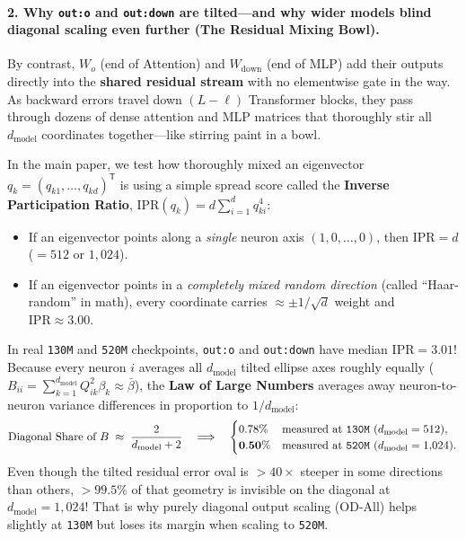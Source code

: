 \documentclass[11pt]{article}
\newcommand{\Tr}{{\mathsf{T}}}
\newcommand{\dm}{d_{\mathrm{model}}}
\newcommand{\mname}[1]{#1}
\begin{document}
\paragraph{2. Why \texttt{out:o} and \texttt{out:down} are tilted---and why wider models blind diagonal scaling even further (The Residual Mixing Bowl).}
By contrast, $W_o$ (end of Attention) and $W_{\mathrm{down}}$ (end of MLP) add their outputs directly into the \textbf{shared residual stream} with no elementwise gate in the way.
As backward errors travel down $(L-\ell)$ Transformer blocks, they pass through dozens of dense attention and MLP matrices that thoroughly stir all $\dm$ coordinates together---like stirring paint in a bowl.

In the main paper, we test how thoroughly mixed an eigenvector $q_k = (q_{k1},\dots,q_{kd})^{\Tr}$ is using a simple spread score called the \textbf{Inverse Participation Ratio}, $\mathrm{IPR}(q_k) = d\sum_{i=1}^{d} q_{ki}^4$:
\begin{itemize}[leftmargin=1.5em, itemsep=1.5pt, topsep=2pt]
  \item If an eigenvector points along a \emph{single} neuron axis $(1,0,\dots,0)$, then $\mathrm{IPR} = d$ ($=512$ or $1{,}024$).
  \item If an eigenvector points in a \emph{completely mixed random direction} (called ``Haar-random'' in math), every coordinate carries $\approx \pm 1/\sqrt{d}$ weight and $\mathrm{IPR} \approx \mathbf{3.00}$.
\end{itemize}
In real \texttt{130M} and \texttt{520M} checkpoints, \texttt{out:o} and \texttt{out:down} have median $\mathrm{IPR} = \mathbf{3.01}$!
Because every neuron $i$ averages all $\dm$ tilted ellipse axes roughly equally ($B_{ii} = \sum_{k=1}^{\dm} Q_{ik}^2 \beta_k \approx \bar{\beta}$), the \textbf{Law of Large Numbers} averages away neuron-to-neuron variance differences in proportion to $1/\dm$:
\begin{equation}
  \text{Diagonal Share of } B \;\approx\; \frac{2}{\dm + 2}
  \quad\Longrightarrow\quad
  \begin{cases}
    0.78\% & \text{measured at \texttt{130M} } (\dm = 512), \\
    \mathbf{0.50\%} & \text{measured at \texttt{520M} } (\dm = 1{,}024).
  \end{cases}
  \label{eq:mixing_bowl}
\end{equation}
Even though the tilted residual error oval is $>40\times$ steeper in some directions than others, $>99.5\%$ of that geometry is invisible on the diagonal at $\dm=1{,}024$! That is why purely diagonal output scaling (\mname{OD-All}) helps slightly at \texttt{130M} but loses its margin when scaling to \texttt{520M}.
\end{document}
